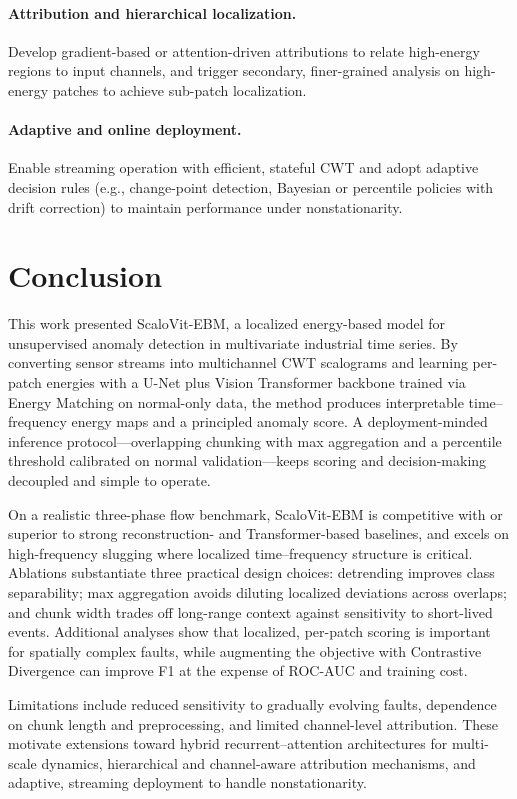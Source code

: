 \documentclass{article}
\begin{document}
\paragraph{Attribution and hierarchical localization.}
Develop gradient-based or attention-driven attributions to relate high-energy regions to input channels, and trigger secondary, finer-grained analysis on high-energy patches to achieve sub-patch localization.

\paragraph{Adaptive and online deployment.}
Enable streaming operation with efficient, stateful CWT and adopt adaptive decision rules (e.g., change-point detection, Bayesian or percentile policies with drift correction) to maintain performance under nonstationarity.

\section{Conclusion}

This work presented ScaloVit-EBM, a localized energy-based model for unsupervised anomaly detection in multivariate industrial time series. By converting sensor streams into multichannel CWT scalograms and learning per-patch energies with a U-Net plus Vision Transformer backbone trained via Energy Matching on normal-only data, the method produces interpretable time–frequency energy maps and a principled anomaly score. A deployment-minded inference protocol—overlapping chunking with max aggregation and a percentile threshold calibrated on normal validation—keeps scoring and decision-making decoupled and simple to operate.

On a realistic three-phase flow benchmark, ScaloVit-EBM is competitive with or superior to strong reconstruction- and Transformer-based baselines, and excels on high-frequency slugging where localized time–frequency structure is critical. Ablations substantiate three practical design choices: detrending improves class separability; max aggregation avoids diluting localized deviations across overlaps; and chunk width trades off long-range context against sensitivity to short-lived events. Additional analyses show that localized, per-patch scoring is important for spatially complex faults, while augmenting the objective with Contrastive Divergence can improve F1 at the expense of ROC-AUC and training cost.

Limitations include reduced sensitivity to gradually evolving faults, dependence on chunk length and preprocessing, and limited channel-level attribution. These motivate extensions toward hybrid recurrent–attention architectures for multi-scale dynamics, hierarchical and channel-aware attribution mechanisms, and adaptive, streaming deployment to handle nonstationarity.
\end{document}
